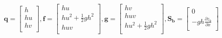                                                         \begin{equation}
                                                          \mathbf{q} =
                                                          \begin{bmatrix}
                                                            h \\
                                                            hu \\
                                                            hv \\
                                                          \end{bmatrix}
                                                          ,
                                                          \mathbf{f} =
                                                          \begin{bmatrix}
                                                            hu \\
                                                            hu^{2} + \frac{1}{2}gh^{2} \\
                                                            huv \\
                                                          \end{bmatrix}
                                                          ,
                                                          \mathbf{g} =
                                                          \begin{bmatrix}
                                                            hv \\
                                                            huv \\
                                                            hu^{2} + \frac{1}{2}gh^{2} \\
                                                          \end{bmatrix}
                                                          ,
                                                          \mathbf{S_{b}} =
                                                          \begin{bmatrix}
                                                            0 \\
                                                            -gh\frac{\partial z_{b}}{\partial x} \\

\end{bmatrix}
\end{equation}
